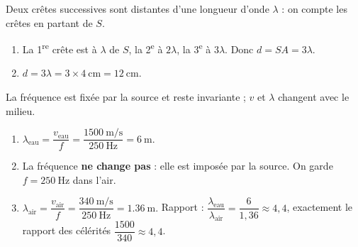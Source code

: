 \documentclass[11pt,a4paper]{article}
\begin{document}
\begin{corrige}
Deux crêtes successives sont distantes d'une longueur d'onde $\lambda$ : on compte les crêtes
en partant de $S$.
\begin{enumerate}[label=\alph*)]
  \item La 1\textsuperscript{re} crête est à $\lambda$ de $S$, la 2\textsuperscript{e} à $2\lambda$,
        la 3\textsuperscript{e} à $3\lambda$. Donc $d = SA = 3\lambda.$
  \item $d = 3\lambda = 3\times\SI{4}{\centi\metre}=\SI{12}{\centi\metre}.$
\end{enumerate}
\end{corrige}

\begin{corrige}
La fréquence est fixée par la source et reste invariante ; $v$ et $\lambda$ changent avec le milieu.
\begin{enumerate}[label=\alph*)]
  \item $\lambda_{\text{eau}}=\dfrac{v_{\text{eau}}}{f}
        =\dfrac{\SI{1500}{\metre\per\second}}{\SI{250}{\hertz}}=\SI{6}{\metre}.$
  \item La fréquence \textbf{ne change pas} : elle est imposée par la source. On garde
        $f=\SI{250}{\hertz}$ dans l'air.
  \item $\lambda_{\text{air}}=\dfrac{v_{\text{air}}}{f}
        =\dfrac{\SI{340}{\metre\per\second}}{\SI{250}{\hertz}}=\SI{1.36}{\metre}.$
        Rapport : $\dfrac{\lambda_{\text{eau}}}{\lambda_{\text{air}}}=\dfrac{6}{1{,}36}\approx 4{,}4$,
        exactement le rapport des célérités $\dfrac{1500}{340}\approx 4{,}4$.
\end{enumerate}
\end{corrige}
\end{document}
